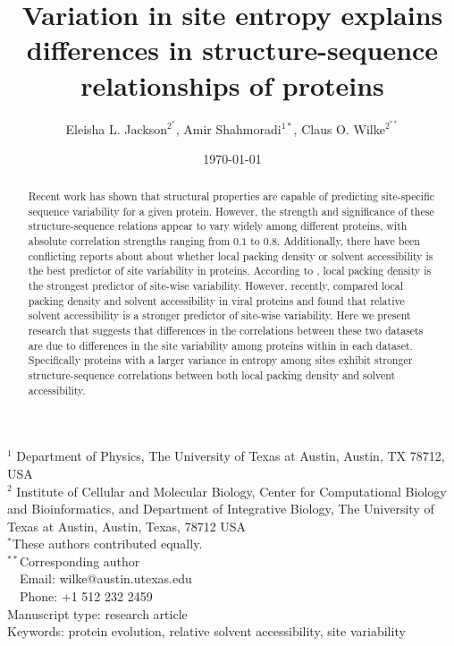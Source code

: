 \documentclass[12pt]{article}
\title{Variation in site entropy explains differences in structure-sequence relationships of proteins}
\author{Eleisha L. Jackson$^{2^*}$, Amir Shahmoradi$^{1*}$, Claus O. Wilke$^{2^{**}}$}
\begin{document}
\date{\today}
\maketitle


\noindent
$^1$ Department of Physics, The University of Texas at Austin, Austin, TX 78712, USA \\
$^2$ Institute of Cellular and Molecular Biology, Center for Computational Biology and Bioinformatics, and Department of Integrative Biology, The University of Texas at Austin, Austin, Texas, 78712 USA\\

\noindent $^{*}$These authors contributed equally. \\

\bigskip
\noindent
$^{**}$Corresponding author\\
$\phantom{^{** }}$Email: wilke@austin.utexas.edu\\
$\phantom{^{**}}$Phone: +1 512 232 2459\\

\bigskip
\noindent
Manuscript type: research article\\
\bigskip
\noindent  Keywords: protein evolution, relative solvent accessibility, site variability


\begin{abstract}
Recent work has shown that structural properties are capable of predicting site-specific sequence variability for a given protein. However, the strength and significance of these structure-sequence relations appear to vary widely among different proteins, with absolute correlation strengths ranging from $0.1$ to $0.8$.  Additionally, there have been conflicting reports about about whether local packing density or solvent accessibility is the best predictor of site variability in proteins. According to \cite{Yehetal2014}, local packing density is the strongest predictor of site-wise variability. However, recently, \cite{Shahmoradietal2014} compared local packing density and solvent accessibility in viral proteins and found that relative solvent accessibility is a stronger predictor of site-wise variability. Here we present research that suggests that differences in the correlations between these two datasets are due to differences in the site variability among proteins within in each dataset. Specifically proteins with a larger variance in entropy among sites exhibit stronger structure-sequence correlations between both local packing density and solvent accessibility. 
\end{abstract}
\vfill
\vfill
\def\thefootnote{\fnsymbol{footnote}}
\setcounter{footnote}{0}
\end{document}
